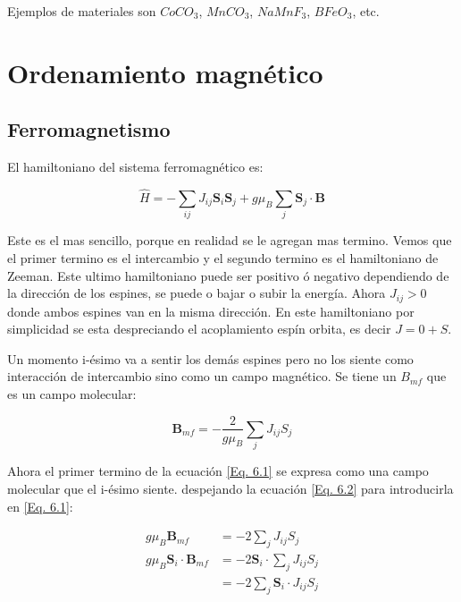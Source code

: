 \documentclass[11pt,fleqn]{book}
\renewcommand{\vec}[1]{\mathbf{#1}}
\begin{document}

Ejemplos de materiales son $CoCO_{3}$, $MnCO_{3}$, $NaMnF_{3}$, $BFeO_{3}$, etc.





\chapter{Ordenamiento magnético}
 \section{Ferromagnetismo}
 
 El hamiltoniano del sistema ferromagnético es:
 
\begin{equation}
    \hat{H}=-\sum_{ij}J_{ij}\vec{S}_{i}\vec{S}_{j}+g\mu_{B}\sum_{j}\vec{S}_{j}\cdot\vec{B}
    \label{Eq. 6.1}
\end{equation}
 
Este es el mas sencillo, porque en realidad se le agregan mas termino. Vemos que el primer termino es el intercambio y el segundo termino es el hamiltoniano de Zeeman. Este ultimo hamiltoniano puede ser positivo ó negativo dependiendo de la dirección de los espines, se puede o bajar o subir la energía. Ahora $J_{ij}>0$ donde ambos espines van en la misma dirección. En este hamiltoniano por simplicidad se esta despreciando el acoplamiento espín orbita, es decir $J=0+S$.



Un momento i-ésimo va a sentir los demás espines pero no los siente como interacción de intercambio sino como un campo magnético. Se tiene un $B_{mf}$ que es un campo molecular:

\begin{equation}
    \vec{B}_{mf}=-\frac{2}{g\mu_{B}}\sum_{j}J_{ij}S_{j}
    \label{Eq. 6.2}
\end{equation}

Ahora el primer termino de la ecuación \ref{Eq. 6.1} se expresa como una campo molecular que el i-ésimo siente. despejando la ecuación \ref{Eq. 6.2} para introducirla en \ref{Eq. 6.1}:

\begin{equation*}
\begin{split}
          g\mu_{B}\vec{B}_{mf}&=-2\sum_{j}J_{ij}S_{j}\\
         g\mu_{B} \vec{S}_{i}\cdot\vec{B}_{mf}&=-2\vec{S}_{i}\cdot\sum_{j}J_{ij}S_{j}\\
         &=-2\sum_{j}\vec{S}_{i}\cdot J_{ij}S_{j}
\end{split}
\end{equation*}
\end{document}
